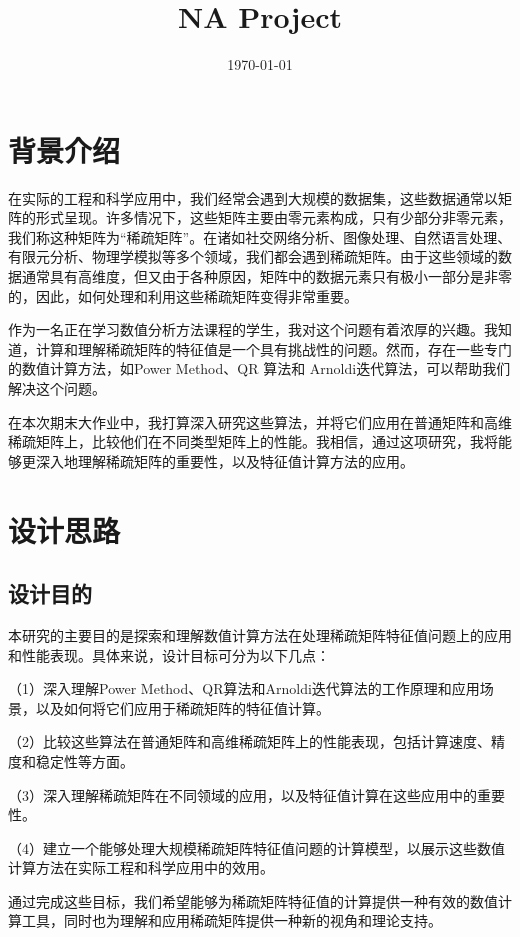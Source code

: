 \documentclass{source/Report}
\title{NA Project}
\date{\today}
\begin{document}
\makecover
\makeheader
\tableofcontents
\section{背景介绍}
在实际的工程和科学应用中，我们经常会遇到大规模的数据集，这些数据通常以矩阵的形式呈现。许多情况下，这些矩阵主要由零元素构成，只有少部分非零元素，我们称这种矩阵为“稀疏矩阵”。在诸如社交网络分析、图像处理、自然语言处理、有限元分析、物理学模拟等多个领域，我们都会遇到稀疏矩阵。由于这些领域的数据通常具有高维度，但又由于各种原因，矩阵中的数据元素只有极小一部分是非零的，因此，如何处理和利用这些稀疏矩阵变得非常重要。

作为一名正在学习数值分析方法课程的学生，我对这个问题有着浓厚的兴趣。我知道，计算和理解稀疏矩阵的特征值是一个具有挑战性的问题。然而，存在一些专门的数值计算方法，如Power Method、QR 算法和 Arnoldi迭代算法，可以帮助我们解决这个问题。

在本次期末大作业中，我打算深入研究这些算法，并将它们应用在普通矩阵和高维稀疏矩阵上，比较他们在不同类型矩阵上的性能。我相信，通过这项研究，我将能够更深入地理解稀疏矩阵的重要性，以及特征值计算方法的应用。
\section{设计思路}
\subsection{设计目的}
本研究的主要目的是探索和理解数值计算方法在处理稀疏矩阵特征值问题上的应用和性能表现。具体来说，设计目标可分为以下几点：

（1）深入理解Power Method、QR算法和Arnoldi迭代算法的工作原理和应用场景，以及如何将它们应用于稀疏矩阵的特征值计算。

（2）比较这些算法在普通矩阵和高维稀疏矩阵上的性能表现，包括计算速度、精度和稳定性等方面。

（3）深入理解稀疏矩阵在不同领域的应用，以及特征值计算在这些应用中的重要性。

（4）建立一个能够处理大规模稀疏矩阵特征值问题的计算模型，以展示这些数值计算方法在实际工程和科学应用中的效用。

通过完成这些目标，我们希望能够为稀疏矩阵特征值的计算提供一种有效的数值计算工具，同时也为理解和应用稀疏矩阵提供一种新的视角和理论支持。
\end{document}
